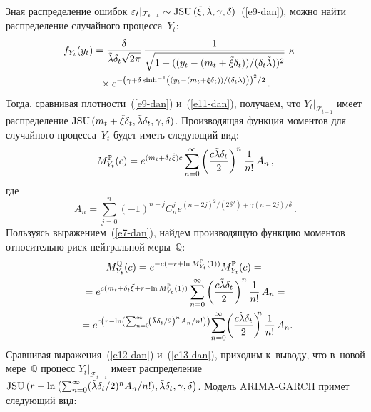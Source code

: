 \begin{multicols}{2}
  Зная распределение ошибок $\varepsilon_t\vert_{\mathcal{F}_{t-1}}\hm\sim 
\mathrm{JSU}\,(\tilde{\xi},\tilde{\lambda},\gamma,\delta)$~(\ref{e9-dan}), можно найти 
распределение случайного процесса~$Y_t$:
  \begin{multline}
 \hspace*{-8.8pt} f_{Y_t}(y_t)=\displaystyle\frac{\displaystyle \delta\mathstrut}{\displaystyle \tilde{\lambda}\delta_t \sqrt{2\pi}\mathstrut}\,\displaystyle\frac{\displaystyle 1\mathstrut}{\displaystyle \sqrt{1+((y_t-(m_t+\tilde{\xi}\delta_t))/(\delta_t\tilde{\lambda}))^2}\mathstrut}\times{}\\
{}\times
e^{-\left(\gamma+\delta\,\mathrm{sinh}^{-1}\left(
({y_t-(m_t+\tilde{\xi}\delta_t)})/
({\delta_t\tilde{\lambda}})\right)\right)^2/2}\,.
  \label{e11-dan}
  \end{multline}
Тогда, сравнивая плотности~(\ref{e9-dan}) и~(\ref{e11-dan}), получаем, что 
$Y_t\vert_{\mathcal{F}_{t-1}}$ имеет распределение $\mathrm{JSU}\,(m_t\hm+ 
\tilde{\xi} \delta_t, 
\tilde{\lambda}\delta_t, \gamma, \delta)$. Производящая функция моментов для 
случайного процесса~$Y_t$ будет иметь следующий вид:
\begin{equation}
M_{Y_t}^{\mathbb{P}}(c)=e^{(m_t+\delta_t\tilde{\xi})c}\sum\limits^\infty_{n=0} 
\left( \displaystyle\frac{\displaystyle c\tilde{\lambda}\delta_t\mathstrut}{\displaystyle 2\mathstrut}\right)^n\displaystyle\frac{\displaystyle 1\mathstrut}{\displaystyle n!\mathstrut}\,A_n\,,
\label{e12-dan}
\end{equation}
где
$$
A_n=\sum\limits^n_{j=0} (-1)^{n-j} C_n^j e^{{(n-
2j)^2}/({2\delta^2})+{\gamma(n-2j)}/{\delta}}\,.
$$
Пользуясь выражением~(\ref{e7-dan}), найдем производящую функцию 
моментов относительно риск-нейт\-раль\-ной меры~$\mathbb{Q}$:
\begin{multline}
M_{Y_t}^{\mathbb{Q}}(c) = e^{-c(-r+\ln M_{Y_t}^{\mathbb{P}}(1))}
M^{\mathbb{P}}_{Y_t}(c)={}\\
{}=
e^{c(m_t+\delta_t \tilde{\xi} +r-\ln M_{Y_t}^{\mathbb{P}}(1))} 
\sum\limits^\infty_{n=0} \left( \fr{c\tilde{\lambda}\delta_t}{2}\right)^n 
\fr{1}{n!}\,A_n={}\\
\!{}=e^{c\left(
r-\ln \left(\sum\nolimits^\infty_{n=0} \!
\left(\tilde{\lambda}\delta_t/2\right)^{n} 
A_n/n!\right)\right)} \!
\sum\limits^\infty_{n=0}\! \left( \fr{c\tilde{\lambda}\delta_t}{2}\right)^{\!\!\!n} 
\fr{1}{n!}\,A_n.\!\!
\label{e13-dan}
\end{multline}
Сравнивая выражения~(\ref{e12-dan}) и~(\ref{e13-dan}), приходим к~выводу, 
что в~новой мере~$\mathbb{Q}$ процесс $Y_t\vert_{\mathcal{F}_{t-1}}$ имеет 
распределение $\mathrm{JSU}\,(r\hm-\ln 
\left(\sum\nolimits^\infty_{n=0}(\tilde{\lambda}\delta_t/2)^n  A_n/n!), 
\tilde{\lambda}\delta_t, \gamma, \delta\right)$. Модель ARIMA-GARCH примет 
следующий вид:

\end{multicols}
